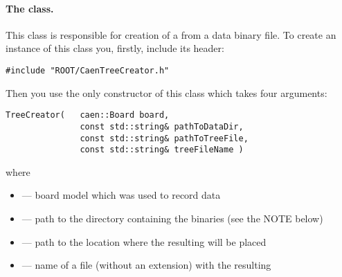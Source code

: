 \paragraph*{The  class.} This class is responsible for
creation of a  from a data binary file.
To create an instance of this class you, firstly, include its header:
\begin{lstlisting}
#include "ROOT/CaenTreeCreator.h"
\end{lstlisting}
Then you use the only constructor of this class which takes four arguments:
\begin{lstlisting}
TreeCreator(   caen::Board board,
               const std::string& pathToDataDir,
               const std::string& pathToTreeFile,
               const std::string& treeFileName )
\end{lstlisting}
where
    \begin{itemize}
        \item[]  --- board model which was used to record data 
        \item[]  --- path to the directory containing the binaries (see the NOTE below)
        \item[]  --- path to the location where the resulting  will be placed
        \item[]  --- name of a  file (without an extension) with the resulting 
    \end{itemize}

